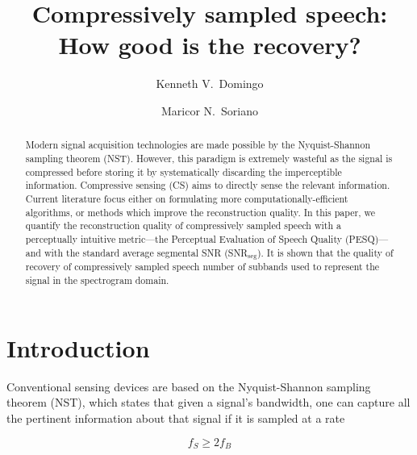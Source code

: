 \documentclass[10pt,a4paper,twoside]{article}
\newcommand{\snrseg}{SNR$_{\mathrm{seg}}$}
\begin{document}


\title{\TitleFont Compressively sampled speech: How good is the recovery?}

\author[*\negthickspace]{Kenneth V.~Domingo}
\author[ ]{Maricor N.~Soriano
\lastauthorsep}


\begin{abstract}
\noindent
Modern signal acquisition technologies are made possible by the Nyquist-Shannon sampling theorem (NST). However, this paradigm is extremely wasteful as the signal is compressed before storing it by systematically discarding the imperceptible information. Compressive sensing (CS) aims to directly sense the relevant information. Current literature focus either on formulating more computationally-efficient algorithms, or methods which improve the reconstruction quality. In this paper, we quantify the reconstruction quality of compressively sampled speech with a perceptually intuitive metric---the Perceptual Evaluation of Speech Quality (PESQ)---and with the standard average segmental SNR (\snrseg). It is shown that the quality of recovery of compressively sampled speech  number of subbands used to represent the signal in the spectrogram domain.


\end{abstract}

\maketitle
\thispagestyle{titlestyle}

\section{Introduction}\label{sec:intro}
Conventional sensing devices are based on the Nyquist-Shannon sampling theorem (NST), which states that given a signal's bandwidth, one can capture all the pertinent information about that signal if it is sampled at a rate

\begin{equation} \label{eq:nst}
	f_S \geq 2f_B
\end{equation}
\end{document}
